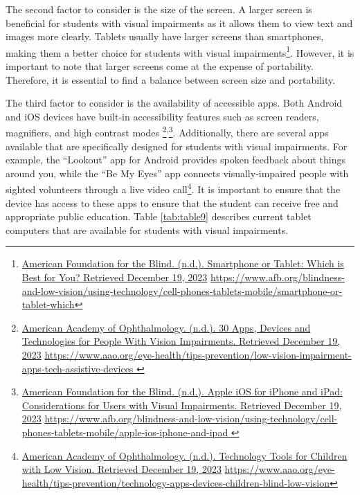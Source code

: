 \documentclass[12pt,letterpaper,twoside]{extreport}
\newcommand\fnsep{\textsuperscript{,}}
\begin{document}
The second factor to consider is the size of the screen. A larger screen is beneficial for students with visual impairments as it allows them to view text and images more clearly. Tablets usually have larger screens than smartphones, making them a better choice for students with visual impairments\footnote{\raggedright \href{https://www.afb.org/blindness-and-low-vision/using-technology/cell-phones-tablets-mobile/smartphone-or-tablet-which}{American Foundation for the Blind. (n.d.). Smartphone or Tablet: Which is Best for You? Retrieved December 19, 2023} \url{https://www.afb.org/blindness-and-low-vision/using-technology/cell-phones-tablets-mobile/smartphone-or-tablet-which}}. However, it is important to note that larger screens come at the expense of portability. Therefore, it is essential to find a balance between screen size and portability.

The third factor to consider is the availability of accessible apps. Both Android and iOS devices have built-in accessibility features such as screen readers, magnifiers, and high contrast modes \footnote{\raggedright \href{https://www.aao.org/eye-health/tips-prevention/low-vision-impairment-apps-tech-assistive-devices }{American Academy of Ophthalmology. (n.d.). 30 Apps, Devices and Technologies for People With Vision Impairments. Retrieved December 19, 2023} \url{https://www.aao.org/eye-health/tips-prevention/low-vision-impairment-apps-tech-assistive-devices }}\fnsep\footnote{\raggedright \href{https://www.afb.org/blindness-and-low-vision/using-technology/cell-phones-tablets-mobile/apple-ios-iphone-and-ipad }{American Foundation for the Blind. (n.d.). Apple iOS for iPhone and iPad: Considerations for Users with Visual Impairments. Retrieved December 19, 2023} \url{https://www.afb.org/blindness-and-low-vision/using-technology/cell-phones-tablets-mobile/apple-ios-iphone-and-ipad }}. Additionally, there are several apps available that are specifically designed for students with visual impairments. For example, the “Lookout” app for Android provides spoken feedback about things around you, while the “Be My Eyes” app connects visually-impaired people with sighted volunteers through a live video call\footnote{\raggedright \href{https://www.aao.org/eye-health/tips-prevention/technology-apps-devices-children-blind-low-vision}{American Academy of Ophthalmology. (n.d.). Technology Tools for Children with Low Vision. Retrieved December 19, 2023} \url{https://www.aao.org/eye-health/tips-prevention/technology-apps-devices-children-blind-low-vision}}. It is important to ensure that the device has access to these apps to ensure that the student can receive free and appropriate public education.
Table \ref{tab:table9} describes current tablet computers that are available for students with visual impairments.
\end{document}
